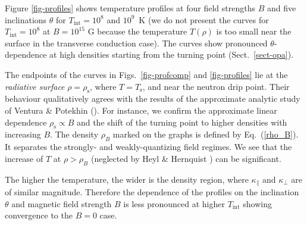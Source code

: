 \documentclass{aa}
\begin{document}
Figure \ref{fig-profiles} shows temperature profiles
at four field strengths $B$ and five inclinations $\theta$
for $T_\mathrm{int}=10^8$ and $10^9$~K
(we do not present the curves for $T_\mathrm{int}=10^8$
at $B=10^{15}$ G
because the temperature $T(\rho)$ is
too small near the surface in the transverse conduction case).
The curves show pronounced $\theta$-dependence
at high densities starting from
the turning point (Sect.~\ref{sect-opa}).

The endpoints of the curves in Figs.~\ref{fig-profcomp}
and \ref{fig-profiles}
lie at the \emph{radiative surface} $\rho=\rho_\mathrm{s}$,
where $T=T_\mathrm{s}$, and near the neutron drip point.
Their behaviour qualitatively agrees 
with the results of the approximate analytic study of
Ventura \& Potekhin (\cite{elounda}).
For instance, we confirm
the approximate linear dependence $\rho_\mathrm{s}\propto B$
and the shift of the turning point to higher densities
with increasing $B$.
The density $\rho_B$ marked on the graphs
is defined by Eq.\ (\ref{rho_B}). It
separates the strongly- and weakly-quantizing field regimes.
We see that the increase
of $T$ at $\rho > \rho_B$
(neglected by Heyl \& Hernquist \cite{hh-theory})
can be significant.

The higher the temperature, the wider
is the density region,
where $\kappa_\|$ and $\kappa_\perp$ are of similar magnitude.
Therefore the dependence of the profiles on the inclination $\theta$
and magnetic field strength $B$
is less pronounced at higher $T_\mathrm{int}$
showing convergence to the $B=0$ case.


\end{document}
